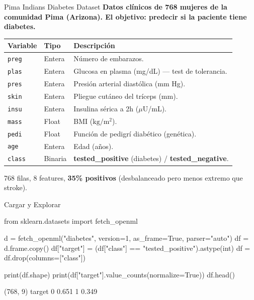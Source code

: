 \documentclass[aspectratio=169, 11pt]{beamer}
\begin{document}
\begin{frame}{Pima Indians Diabetes Dataset}
  \vspace{-4pt}
  {\footnotesize\color{arcaDark}\bfseries
    Datos clínicos de 768 mujeres de la comunidad Pima (Arizona).
    El objetivo: predecir si la paciente \textbf{tiene diabetes}.}

  \vspace{6pt}
  {\scriptsize
  \begin{tabular}{@{}llp{6.5cm}@{}}
    \toprule
    \textbf{Variable} & \textbf{Tipo} & \textbf{Descripción} \\
    \midrule
    \texttt{preg} & Entera & Número de embarazos. \\
    \texttt{plas} & Entera & Glucosa en plasma (mg/dL) --- test de tolerancia. \\
    \texttt{pres} & Entera & Presión arterial diastólica (mm Hg). \\
    \texttt{skin} & Entera & Pliegue cutáneo del tríceps (mm). \\
    \texttt{insu} & Entera & Insulina sérica a 2h ($\mu$U/mL). \\
    \texttt{mass} & Float & BMI ($\text{kg}/\text{m}^2$). \\
    \texttt{pedi} & Float & Función de pedigrí diabético (genética). \\
    \texttt{age} & Entera & Edad (años). \\
    \midrule
    \texttt{class} & Binaria & \textbf{tested\_positive} (diabetes) / \textbf{tested\_negative}. \\
    \bottomrule
  \end{tabular}
  }

  \vspace{4pt}
  {\scriptsize\color{textMuted}
    \faArrowRight\hspace{4pt} 768 filas, 8 features, \textbf{35\% positivos}
    (desbalanceado pero menos extremo que stroke).}
\end{frame}

\begin{frame}[fragile,shrink=18]{Cargar y Explorar}
  \vspace{-6pt}
  \begin{pyblock}
from sklearn.datasets import fetch_openml

d = fetch_openml("diabetes", version=1, as_frame=True, parser="auto")
df = d.frame.copy()
df["target"] = (df["class"] == "tested_positive").astype(int)
df = df.drop(columns=["class"])

print(df.shape)
print(df["target"].value_counts(normalize=True))
df.head()
  \end{pyblock}

  \vspace{4pt}
  \begin{outputblock}
(768, 9)
target
0    0.651
1    0.349
  \end{outputblock}
\end{frame}
\end{document}

